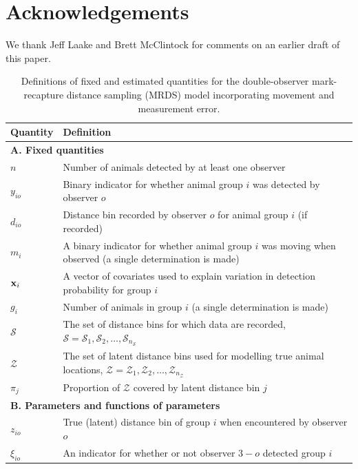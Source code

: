 \documentclass[aoas,preprint]{imsart}
\numberwithin{equation}{section}
\theoremstyle{plain}
\begin{document}
\section*{Acknowledgements}
We thank Jeff Laake and Brett McClintock for comments on an earlier draft of this paper.





\begin{table}[ht]
\caption{Definitions of fixed and estimated quantities for the double-observer mark-recapture distance sampling (MRDS) model incorporating movement and measurement error.
}
\label{tab:notation}
\raggedright
\begin{tabular}{p{2cm}p{13cm}}
  \hline
   Quantity & Definition \\
  \hline
   \multicolumn{2}{l}{\textbf{A. Fixed quantities}}   \\
  $n$ & Number of animals detected by at least one observer \\
  $y_{io}$ & Binary indicator for whether animal group $i$ was detected by observer $o$\\
  $d_{io}$ & Distance bin recorded by observer $o$ for animal group $i$ (if recorded) \\
  $m_{i}$ & A binary indicator for whether animal group $i$ was moving when observed (a single determination is made) \\
  ${\bf x}_i$ & A vector of covariates used to explain variation in detection probability for group $i$ \\
  $g_i$ & Number of animals in group $i$ (a single determination is made) \\
  $\mathcal{S}$ & The set of distance bins for which data are recorded, $\mathcal{S}=\mathcal{S}_1,\mathcal{S}_2,\hdots,\mathcal{S}_{n_\mathcal{S}}$ \\
  $\mathcal{Z}$ & The set of latent distance bins used for modelling true animal locations, $\mathcal{Z}=\mathcal{Z}_1,\mathcal{Z}_2,\hdots,\mathcal{Z}_{n_\mathcal{Z}}$
  \\
  $\pi_j$ & Proportion of $\mathcal{Z}$ covered by latent distance bin $j$ \\
  \multicolumn{2}{l}{\textbf{B. Parameters and functions of parameters}} \\
  $z_{io}$ & True (latent) distance bin of group $i$ when encountered by observer $o$ \\
  $\xi_{io}$ & An indicator for whether or not observer $3-o$ detected group $i$ \\

\end{tabular}
\end{table}
\end{document}
